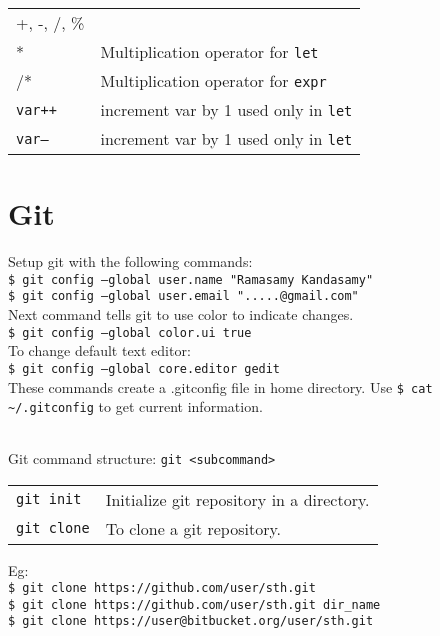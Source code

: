 \begin{tabularx}{\linewidth}{lX}
+, -, /, \% & \\
* & Multiplication operator for \texttt{let}\\
/* & Multiplication operator for \texttt{expr}\\
\texttt{var++} & increment var by 1 used only in \texttt{let}\\
\texttt{var--} & increment var by 1 used only in \texttt{let}
\end{tabularx}


\vfill\null
\pagebreak

\section{Git}


Setup git with the following commands:\\
\texttt{\$ git config --global user.name "Ramasamy Kandasamy"}\\
\texttt{\$ git config --global user.email ".....@gmail.com"}\\
Next command tells git to use color to indicate changes.\\
\texttt{\$ git config --global color.ui true}\\
To change default text editor:\\
\texttt{\$ git config --global core.editor gedit}\\
These commands create a .gitconfig file in home directory. Use \texttt{\$ cat \~{}/.gitconfig} to get current information.\\
\begin{tabularx}{\linewidth}{X}
\hline
\end{tabularx}


Git command structure: \texttt{git <subcommand>}
\begin{tabularx}{\linewidth}{lX}
\texttt{git init} & Initialize git repository in a directory.\\
\texttt{git clone} & To clone a git repository.\\ 
\end{tabularx}
Eg:\\
\texttt{\$ git clone https://github.com/user/sth.git}\\
\texttt{\$ git clone https://github.com/user/sth.git dir\_name}\\
\texttt{\$ git clone https://user@bitbucket.org/user/sth.git}\\
\begin{tabularx}{\linewidth}{X}
\hline 
\end{tabularx}


